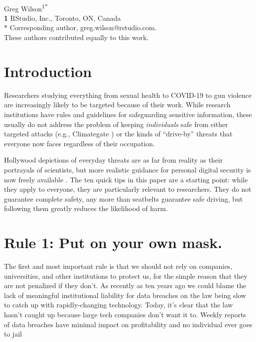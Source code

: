 \documentclass[10pt,letterpaper]{article}
\newcommand{\rulemajor}[1]{\section*{#1}}
\begin{document}
\vspace*{0.2in}

\begin{flushleft}
{\Large
\textbf{}
}
\newline
\\
{Greg Wilson}\textsuperscript{1{\ddag}*}
\\
\bigskip
\textbf{1} RStudio, Inc., Toronto, ON, Canada\\
* Corresponding author, greg.wilson@rstudio.com. \\
\bigskip
{\ddag} These authors contributed equally to this work.
\end{flushleft}

\section*{Introduction}

Researchers studying everything from sexual health to COVID-19 to gun violence
are increasingly likely to be targeted because of their work.
While research institutions have rules and guidelines for safeguarding sensitive information,
these usually do not address the problem of keeping \emph{individuals} safe
from either targeted attacks (e.g., Climategate \cite{Natu2010})
or the kinds of ``drive-by'' threats that everyone now faces regardless of their occupation.

Hollywood depictions of everyday threats are as far from reality as their portrayals of scientists,
but more realistic guidance for personal digital security is now freely available \cite{FLD,EFJ2015,EFF}.
The ten quick tips in this paper are a starting point:
while they apply to everyone,
they are particularly relevant to researchers.
They do not guarantee complete safety,
any more than seatbelts guarantee safe driving,
but following them greatly reduces the likelihood of harm.

\rulemajor{Rule 1: Put on your own mask.}

The first and most important rule is that
we should not rely on companies, universities, and other institutions to protect us,
for the simple reason that they are not penalized if they don't.
As recently as ten years ago we could blame the lack of meaningful institutional liability for data breaches
on the law being slow to catch up with rapidly-changing technology.
Today,
it's clear that the law hasn't caught up because large tech companies don't want it to.
Weekly reports of data breaches have minimal impact on profitability and no individual ever goes to jail
\end{document}
